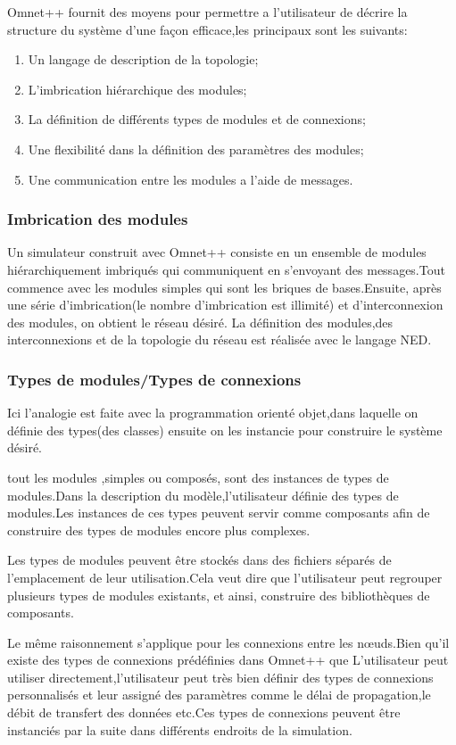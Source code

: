 Omnet++ fournit des moyens  pour permettre a l'utilisateur de décrire  la structure du système d'une façon efficace,les principaux sont les suivants:

\begin{enumerate}
\item Un langage de description de la topologie;
\item L'imbrication hiérarchique des modules;
\item La définition de différents types de modules et de connexions;
\item Une flexibilité dans la définition des paramètres des modules;
\item Une communication entre les modules a l'aide de messages.
\end{enumerate}

\subsubsection{Imbrication des modules}
Un simulateur construit avec Omnet++ consiste en un ensemble de modules hiérarchiquement imbriqués qui communiquent en s'envoyant des messages.Tout commence avec les modules simples qui sont les briques de bases.Ensuite, après une série  d'imbrication(le nombre d'imbrication est illimité) et d'interconnexion des modules, on obtient le réseau désiré.
La définition des modules,des interconnexions et de la topologie du réseau est réalisée avec le langage NED.

\subsubsection{Types de modules/Types de connexions }
Ici l'analogie est faite avec la programmation orienté objet,dans laquelle on définie des types(des classes) ensuite on les instancie pour construire le système désiré.

tout les modules ,simples ou composés, sont des instances de types de modules.Dans la description du modèle,l'utilisateur définie des types de modules.Les instances de ces types peuvent servir comme composants afin de construire des types de modules encore plus complexes.

Les types de modules peuvent être stockés dans des fichiers séparés de l'emplacement de leur utilisation.Cela veut dire que l'utilisateur peut regrouper plusieurs types de modules existants, et ainsi, construire des bibliothèques de composants.

Le même raisonnement s'applique pour les connexions entre les nœuds.Bien qu'il existe des types de connexions prédéfinies dans Omnet++ que L'utilisateur peut utiliser directement,l'utilisateur peut très bien définir des types de connexions  personnalisés et leur assigné des paramètres comme le délai de propagation,le débit de transfert des données etc.Ces types de connexions peuvent être instanciés par la suite dans différents endroits de la simulation. 
